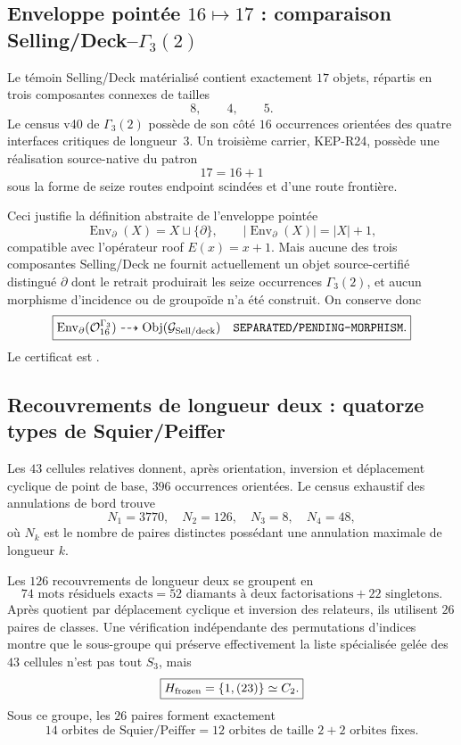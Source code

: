\documentclass[11pt,a4paper]{article}
\begin{document}
\subsection{Enveloppe pointée $16\mapsto17$ : comparaison Selling/Deck--$\Gamma_3(2)$}

Le témoin Selling/Deck matérialisé contient exactement $17$ objets, répartis en trois composantes connexes de tailles
\[
 \boxed{8,
 \qquad4,
 \qquad5.}
\]
Le census v40 de $\Gamma_3(2)$ possède de son côté $16$ occurrences orientées des quatre interfaces critiques de longueur~$3$. Un troisième carrier, KEP-R24, possède une réalisation source-native du patron
\[
 \boxed{17=16+1}
\]
sous la forme de seize routes endpoint scindées et d'une route frontière.

Ceci justifie la définition abstraite de l'enveloppe pointée
\[
 \operatorname{Env}_{\partial}(X)=X\sqcup\{\partial\},
 \qquad
 |\operatorname{Env}_{\partial}(X)|=|X|+1,
\]
compatible avec l'opérateur roof $E(x)=x+1$. Mais aucune des trois composantes Selling/Deck ne fournit actuellement un objet source-certifié distingué $\partial$ dont le retrait produirait les seize occurrences $\Gamma_3(2)$, et aucun morphisme d'incidence ou de groupoïde n'a été construit. On conserve donc
\[
 \boxed{
 \operatorname{Env}_{\partial}(\mathcal O_{16}^{\Gamma_3})
 \dashrightarrow
 \operatorname{Obj}(\mathcal G_{\rm Sell/deck})
 \quad\texttt{SEPARATED/PENDING-MORPHISM}.}
\]
Le certificat est .

\subsection{Recouvrements de longueur deux : quatorze types de Squier/Peiffer}

Les $43$ cellules relatives donnent, après orientation, inversion et déplacement cyclique de point de base, $396$ occurrences orientées. Le census exhaustif des annulations de bord trouve
\[
 \boxed{
 N_1=3770,
 \quad N_2=126,
 \quad N_3=8,
 \quad N_4=48,}
\]
où $N_k$ est le nombre de paires distinctes possédant une annulation maximale de longueur $k$.

Les $126$ recouvrements de longueur deux se groupent en
\[
 \boxed{74\text{ mots résiduels exacts}
 =52\text{ diamants à deux factorisations}
 +22\text{ singletons}.}
\]
Après quotient par déplacement cyclique et inversion des relateurs, ils utilisent $26$ paires de classes. Une vérification indépendante des permutations d'indices montre que le sous-groupe qui préserve effectivement la liste spécialisée gelée des $43$ cellules n'est pas tout $S_3$, mais
\[
 \boxed{H_{\rm frozen}=\{1,(23)\}\simeq C_2.}
\]
Sous ce groupe, les $26$ paires forment exactement
\[
 \boxed{14\text{ orbites de Squier/Peiffer}
 =12\text{ orbites de taille }2+2\text{ orbites fixes}.}
\]
\end{document}
